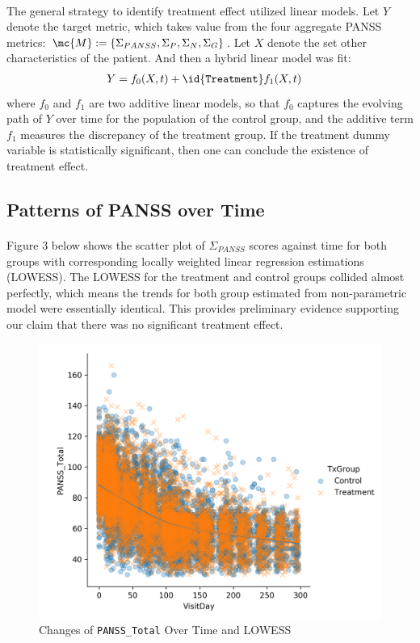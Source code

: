 \documentclass[11pt]{article}
\begin{document}
	\paragraph{}The general strategy to identify treatment effect utilized linear models. Let $Y$ denote the target metric, which takes value from the four aggregate PANSS metrics: $\mc{M} := \{ \Sigma_{PANSS}, \Sigma_P, \Sigma_N, \Sigma_G\}$. Let $X$ denote the set other characteristics of the patient. And then a hybrid linear model was fit:
	\begin{align}
		Y &= f_0(X, t) + \id{\texttt{Treatment}} f_1(X, t)
	\end{align}
	where $f_0$ and $f_1$ are two additive linear models, so that $f_0$ captures the evolving path of $Y$ over time for the population of the control group, and the additive term $f_1$ measures the discrepancy of the treatment group.
	If the treatment dummy variable is statistically significant, then one can conclude the existence of treatment effect.
	\subsection{Patterns of PANSS over Time}
	\paragraph{}Figure 3 below shows the scatter plot of $\Sigma_{PANSS}$ scores against time for both groups with corresponding locally weighted linear regression estimations (LOWESS). The LOWESS for the treatment and control groups collided almost perfectly, which means the trends for both group estimated from non-parametric model were essentially identical. This provides preliminary evidence supporting our claim that there was no significant treatment effect.
	\begin{figure}[H]
		\centering
		\includegraphics[width=0.7\linewidth]{figures/lwlm_te_PANSS_Total.png}
		\caption{Changes of \texttt{PANSS\_Total} Over Time and LOWESS}
	\end{figure}
\end{document}
